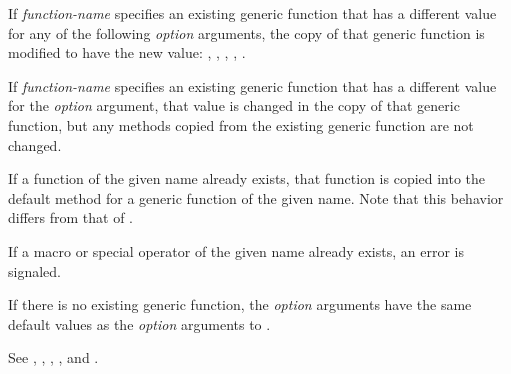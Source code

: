 \begin{defspec}
If \emph{function-name\/} specifies an existing generic function that has a
different value for any of the following \emph{option\/} arguments, the
copy of that generic function is modified to have the new value: 
, , , 
, .

If \emph{function-name\/} specifies an existing generic function that has a
different value for the  \emph{option\/} argument,
that value is changed in the copy of that generic function, but any
methods copied from the existing generic function are not changed.

If a function of the given name already exists, that function is copied into
the default method for a generic function of the given name.  Note that
this behavior differs from that of .

If a macro or special operator of the given name already exists, an error
is signaled.

If there is no existing generic function, the \emph{option\/} arguments have
the same default values as the \emph{option\/} arguments to .

See ,
,
,
,
and .
\end{defspec}


